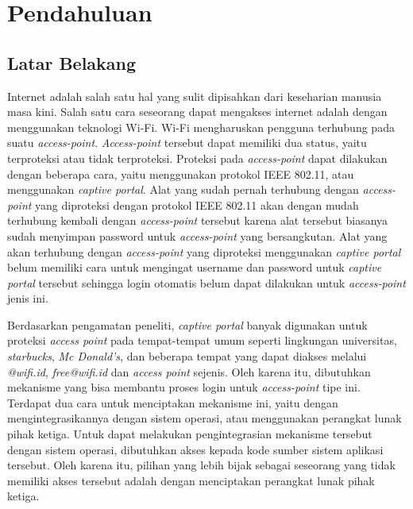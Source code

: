 \chapter{Pendahuluan}
\label{chap:pendahuluan}



\section{Latar Belakang}
\label{sec:latar_belakang}

Internet adalah salah satu hal yang sulit dipisahkan dari keseharian manusia masa kini. Salah satu cara seseorang dapat mengakses internet adalah dengan menggunakan teknologi Wi-Fi. Wi-Fi mengharuskan pengguna terhubung pada suatu \textit{access-point}. \textit{Access-point} tersebut dapat memiliki dua status, yaitu terproteksi atau tidak terproteksi. Proteksi pada \textit{access-point} dapat dilakukan dengan beberapa cara, yaitu menggunakan protokol IEEE 802.11, atau menggunakan \textit{captive portal}. Alat yang sudah pernah terhubung dengan \textit{access-point} yang diproteksi dengan protokol IEEE 802.11 akan dengan mudah terhubung kembali dengan \textit{access-point} tersebut karena alat tersebut biasanya sudah menyimpan password untuk \textit{access-point} yang bersangkutan. Alat yang akan terhubung dengan \textit{access-point} yang diproteksi menggunakan \textit{captive portal} belum memiliki cara untuk mengingat username dan password untuk \textit{captive portal} tersebut sehingga login otomatis belum dapat dilakukan untuk \textit{access-point} jenis ini.

Berdasarkan pengamatan peneliti, \textit{captive portal} banyak digunakan untuk proteksi \textit{access point} pada tempat-tempat umum seperti lingkungan universitas, \textit{starbucks}, \textit{Mc Donald's}, dan beberapa tempat yang dapat diakses melalui \textit{@wifi.id}, \textit{free@wifi.id} dan \textit{access point} sejenis. Oleh karena itu, dibutuhkan mekanisme yang bisa membantu proses login untuk \textit{access-point} tipe ini. Terdapat dua cara untuk menciptakan mekanisme ini, yaitu dengan mengintegrasikannya dengan sistem operasi, atau menggunakan perangkat lunak pihak ketiga. Untuk dapat melakukan pengintegrasian mekanisme tersebut dengan sistem operasi, dibutuhkan akses kepada kode sumber sistem aplikasi tersebut. Oleh karena itu, pilihan yang lebih bijak sebagai seseorang yang tidak memiliki akses tersebut adalah dengan menciptakan perangkat lunak pihak ketiga.



